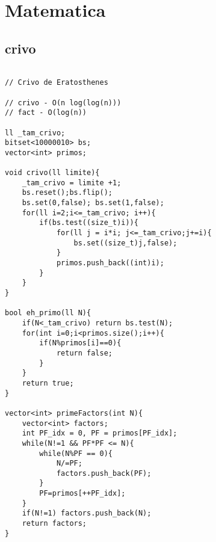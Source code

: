 \documentclass[landscape,twocolumn,10pt,a4paper]{article}
\begin{document}
\section{Matematica}
\subsection{crivo}
\begin{verbatim}

// Crivo de Eratosthenes

// crivo - O(n log(log(n)))
// fact - O(log(n))

ll _tam_crivo;
bitset<10000010> bs;
vector<int> primos;

void crivo(ll limite){
    _tam_crivo = limite +1;
    bs.reset();bs.flip();
    bs.set(0,false); bs.set(1,false);
    for(ll i=2;i<=_tam_crivo; i++){
        if(bs.test((size_t)i)){
            for(ll j = i*i; j<=_tam_crivo;j+=i){
                bs.set((size_t)j,false);
            }
            primos.push_back((int)i);
        }
    }
}

bool eh_primo(ll N){
    if(N<_tam_crivo) return bs.test(N);
    for(int i=0;i<primos.size();i++){
        if(N%primos[i]==0){
            return false;
        }
    }
    return true;
}

vector<int> primeFactors(int N){
    vector<int> factors;
    int PF_idx = 0, PF = primos[PF_idx];
    while(N!=1 && PF*PF <= N){
        while(N%PF == 0){
            N/=PF;
            factors.push_back(PF);
        }
        PF=primos[++PF_idx];
    }
    if(N!=1) factors.push_back(N);
    return factors;
}

\end{verbatim}
\end{document}
